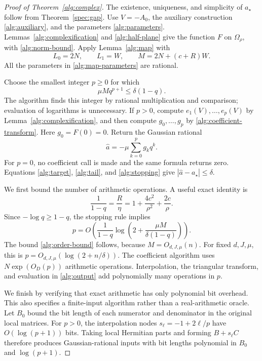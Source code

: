 \documentclass[reqno]{amsart}
\theoremstyle{definition}
\theoremstyle{remark}
\begin{document}
\begin{proof}[Proof of Theorem~\ref{alg:complex}]
The existence, uniqueness, and simplicity of \(a_\star\) follow
from Theorem~\ref{spec:gap}.
Use \(V=-A_0\), the auxiliary construction
\eqref{alg:auxiliary}, and the parameters
\eqref{alg:parameters}.
Lemmas~\ref{alg:complexification} and
\ref{alg:half-plane} give the function \(F\) on
\(\Omega_\rho\), with \eqref{alg:norm-bound}.
Apply Lemma~\ref{alg:map} with
\[
 L_0=2N,\qquad L_1=W,\qquad
 M=2N+(c+R)W.
 \]
All the parameters in \eqref{alg:map-parameters} are rational.

Choose the smallest integer \(p\ge0\) for which
\begin{equation}
 \mu M q^{p+1}\le\delta(1-q).
 \label{alg:stopping}
\end{equation}
The algorithm finds this integer by rational multiplication and
comparison; evaluation of logarithms is unnecessary.
If \(p>0\), compute \(e_1(V),\ldots,e_p(V)\) by
Lemma~\ref{alg:complexification}, and then compute
\(g_0,\ldots,g_p\) by
\eqref{alg:coefficient-transform}.
Here \(g_0=F(0)=0\).
Return the Gaussian rational
\begin{equation}
 \widehat a=-\mu\sum_{k=0}^p g_kq^k.
 \label{alg:output}
\end{equation}
For \(p=0\), no coefficient call is made and the same formula
returns zero.
Equations \eqref{alg:target}, \eqref{alg:tail}, and
\eqref{alg:stopping} give
\(|\widehat a-a_\star|\le\delta\).

We first bound the number of arithmetic operations.
A useful exact identity is
\begin{equation}
 \frac1{1-q}=\frac R\eta
     =1+\frac{4c^2}{\rho^2}+\frac{2c}{\rho}.
 \label{alg:contraction-parameter}
\end{equation}
Since \(-\log q\ge1-q\), the stopping rule implies
\[
 p=O\!\left(
   \frac1{1-q}
   \log\!\left(2+\frac{\mu M}{\delta(1-q)}\right)
 \right).
 \]
The bound \eqref{alg:order-bound} follows, because
\(M=O_{d,J,\mu}(n)\).
For fixed \(d,J,\mu\), this is
\(p=O_{d,J,\mu}(\log(2+n/\delta))\).
The coefficient algorithm uses
\(N\exp(O_D(p))\) arithmetic operations.
Interpolation, the triangular transform, and evaluation in
\eqref{alg:output} add polynomially many operations in \(p\).

We finish by verifying that exact arithmetic has only polynomial
bit overhead.  This also specifies a finite-input algorithm rather
than a real-arithmetic oracle.
Let \(B_0\) bound the bit length of each numerator and denominator
in the original local matrices.
For \(p>0\), the interpolation nodes
\(s_\ell=-1+2\ell/p\) have \(O(\log(p+1))\) bits.
Taking local Hermitian parts and forming \(B+s_\ell C\)
therefore produces Gaussian-rational inputs with bit lengths
polynomial in \(B_0\) and \(\log(p+1)\).


\end{proof}
\end{document}
